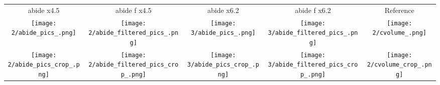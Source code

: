\begin{tabular}{c @{\hskip 0pt} c @{\hskip 0pt} c @{\hskip 0pt} c @{\hskip 0pt} c}
    abide x4.5 & abide f x4.5 & abide x6.2 & abide f x6.2 & Reference\\
    \texttt{[image: 2/abide\_pics\_.png]}&
    \texttt{[image: 2/abide\_filtered\_pics\_.png]}&
    \texttt{[image: 3/abide\_pics\_.png]}&
    \texttt{[image: 3/abide\_filtered\_pics\_.png]}&
    \texttt{[image: 2/cvolume\_.png]}\\
    \texttt{[image: 2/abide\_pics\_crop\_.png]}&
    \texttt{[image: 2/abide\_filtered\_pics\_crop\_.png]}&
    \texttt{[image: 3/abide\_pics\_crop\_.png]}&
    \texttt{[image: 3/abide\_filtered\_pics\_crop\_.png]}&
    \texttt{[image: 2/cvolume\_crop\_.png]}
\end{tabular}